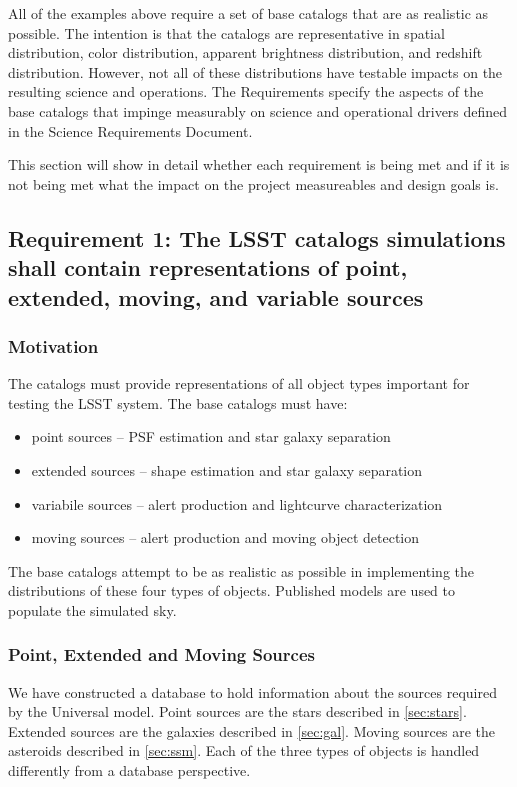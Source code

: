 \documentclass[]{article}
\begin{document}
All of the examples above require a set of base catalogs that are as realistic as possible.  The intention
is that the catalogs are representative in spatial distribution, color distribution, apparent
brightness distribution, and redshift distribution.  However, not all of these distributions have testable impacts
on the resulting science and operations.
The Requirements specify the aspects of the base catalogs that impinge measurably on science and 
operational drivers defined in the Science Requirements Document.

This section will show in detail whether each requirement is being met and if it is not
being met what the impact on the project measureables and design goals is.


\subsection{Requirement 1: The LSST catalogs simulations shall contain representations of point,
extended, moving, and variable sources}
\subsubsection{Motivation}
The catalogs must provide representations of all object types important for testing the LSST system.  The base catalogs must
have:
\begin{itemize}
\item point sources -- PSF estimation and star galaxy separation
\item extended sources -- shape estimation and star galaxy separation
\item variabile sources -- alert production and lightcurve characterization
\item moving sources -- alert production and moving object detection
\end{itemize}

The base catalogs attempt to be as realistic as possible in implementing the distributions of these four types of objects.
Published models are used to populate the simulated sky.

\subsubsection{Point, Extended and Moving Sources}
We have constructed a database to hold information about the sources required by the Universal model.
Point sources are the stars described in \ref{sec:stars}.  Extended sources are the galaxies described in \ref{sec:gal}.
Moving sources are the asteroids described in \ref{sec:ssm}.  Each of the three types of objects is handled differently
from a database perspective.
\end{document}
